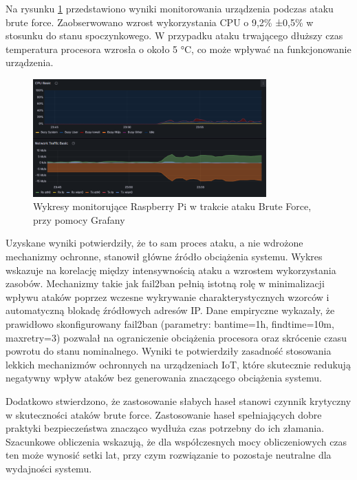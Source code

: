 Na rysunku \ref{fig:Wykresy monitorujące Raspberry Pi w trakcie ataku Brute Force, przy pomocy Grafany} przedstawiono wyniki monitorowania urządzenia podczas ataku brute force. Zaobserwowano wzrost wykorzystania CPU o 9,2\% ±0,5\% w stosunku do stanu spoczynkowego. W przypadku ataku trwającego dłuższy czas temperatura procesora wzrosła o około 5 °C, co może wpływać na funkcjonowanie urządzenia.
\begin{figure}[h]
    \centering
    \includegraphics[width=0.8\textwidth]{pictures/brute-force-pi.png}
    \caption{Wykresy monitorujące Raspberry Pi w trakcie ataku Brute Force, przy pomocy Grafany}
    \label{fig:Wykresy monitorujące Raspberry Pi w trakcie ataku Brute Force, przy pomocy Grafany}
\end{figure}

Uzyskane wyniki potwierdziły, że to sam proces ataku, a nie wdrożone mechanizmy ochronne, stanowił główne źródło obciążenia systemu. Wykres wskazuje na korelację między intensywnością ataku a wzrostem wykorzystania zasobów. Mechanizmy takie jak fail2ban pełnią istotną rolę w minimalizacji wpływu ataków poprzez wczesne wykrywanie charakterystycznych wzorców i automatyczną blokadę źródłowych adresów IP. Dane empiryczne wykazały, że prawidłowo skonfigurowany fail2ban (parametry: bantime=1h, findtime=10m, maxretry=3) pozwalał na ograniczenie obciążenia procesora oraz skrócenie czasu powrotu do stanu nominalnego. Wyniki te potwierdziły zasadność stosowania lekkich mechanizmów ochronnych na urządzeniach IoT, które skutecznie redukują negatywny wpływ ataków bez generowania znaczącego obciążenia systemu.

Dodatkowo stwierdzono, że zastosowanie słabych haseł stanowi czynnik krytyczny w skuteczności ataków brute force. Zastosowanie haseł spełniających dobre praktyki bezpieczeństwa znacząco wydłuża czas potrzebny do ich złamania. Szacunkowe obliczenia wskazują, że dla współczesnych mocy obliczeniowych czas ten może wynosić setki lat, przy czym rozwiązanie to pozostaje neutralne dla wydajności systemu.

